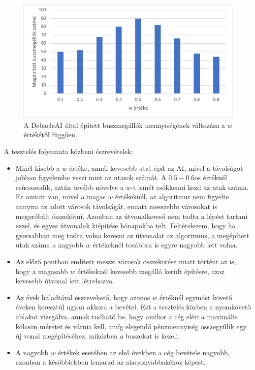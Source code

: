 \begin{figure}
	\centering
	\includegraphics[scale=1]{images/wallomas.png}
	\caption{A DebacleAI által épített buszmegállók mennyiségének változása a $w$ értékétől függően.}
	\label{fig:wmegallok}
\end{figure}

A tesztelés folyamata közbeni észrevételek:
\begin{itemize}
	\item Minél kisebb a $w$ értéke, annál kevesebb utat épít az AI, mivel a távolságot jobban figyelembe veszi mint az utasok számát. A $0.5-0.6$os értéknél csúcsosodik, aztán tovább növelve a $w$-t ismét csökkenni kezd az utak száma. Ez amiatt van, mivel a magas $w$ értékeknél, az algoritmus nem figyelte annyira az adott városok távolságát, emiatt messzebbi városokat is megpróbált összekötni. Azonban az útvonalkereső nem tudta a lépést tartani ezzel, és egyes útvonalak kiépítése hónapokba telt. Feltételezem, hogy ha gyorsabban meg tudta volna keresni az útvonalat az algoritmus, a megépített utak száma a nagyobb $w$ értékeknél továbbra is egyre nagyobb lett volna.
	\item Az előző pontban említett messzi városok összekötése miatt történt az is, hogy a magasabb $w$ értékeknél kevesebb megálló került építésre, azaz kevesebb útvonal lett létrehozva.
	\item Az évek haladtával észrevehető, hogy azonos $w$ értéknél egymást követő éveken keresztül ugyan akkora a bevétel. Ezt a tesztelés közben a nyomkövető ablakot vizsgálva, annak tudható be, hogy amikor a cég eléri a maximális kölcsön méretet és várnia kell, amíg elegendő pénzmennyiség összegyűlik egy új vonal megépítéséhez, miközben a buszokat is kezeli.
	\item A nagyobb $w$ értékek esetében az első években a cég bevétele nagyobb, azonban a későbbiekben lemarad az alacsonyabbakéhoz képest.
\end{itemize}
